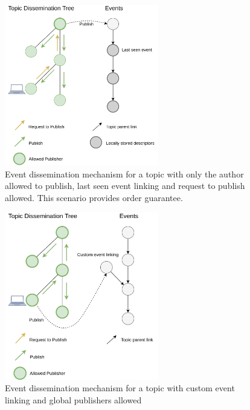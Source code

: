 \begin{figure}[hb!]
  \centering
  \includegraphics[width=0.6\textwidth]{img/pulsarcast-publish-order-guarantee.png}
  \caption{Event dissemination mechanism for a topic with only the author allowed to publish, last seen event linking and request to publish allowed. This scenario provides order guarantee.}
  \label{fig:pulsarcast-publish-order-guarantee}
\end{figure}

\begin{figure}[hb!]
  \centering
  \includegraphics[width=0.6\textwidth]{img/pulsarcast-publish-custom.png}
  \caption{Event dissemination mechanism for a topic with custom event linking and global publishers allowed}
  \label{fig:pulsarcast-publish-custom}
\end{figure}

